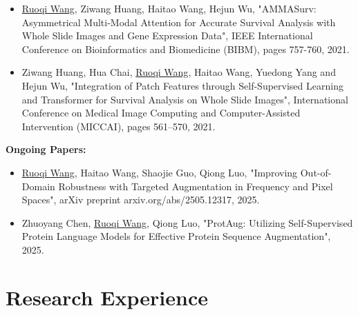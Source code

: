\documentclass[letterpaper,10pt]{article}
\begin{document}
\begin{CJK}{UTF8}{gbsn}
\begin{itemize}
    \item{
    \underline{Ruoqi Wang}, Ziwang Huang, Haitao Wang, Hejun Wu, "{AMMASurv: Asymmetrical Multi-Modal Attention for Accurate Survival Analysis with Whole Slide Images and Gene Expression Data}", IEEE International Conference on Bioinformatics and Biomedicine (BIBM), pages 757-760, 2021.
    }

    \item{
    Ziwang Huang, Hua Chai, \underline{Ruoqi Wang}, Haitao Wang, Yuedong Yang and Hejun Wu, "{Integration of Patch Features through Self-Supervised Learning and Transformer for Survival Analysis on Whole Slide Images}", International Conference on Medical Image Computing and Computer-Assisted Intervention (MICCAI), pages 561–570, 2021.
    }

 \end{itemize}


\vspace{2pt}
\textbf{Ongoing Papers:}
\begin{itemize}
    \item{
    \underline{Ruoqi Wang}, Haitao Wang, Shaojie Guo, Qiong Luo, "{Improving Out-of-Domain Robustness with Targeted Augmentation in Frequency and Pixel Spaces}", arXiv preprint arxiv.org/abs/2505.12317, 2025.
    }

    \item{
    Zhuoyang Chen, \underline{Ruoqi Wang}, Qiong Luo, "{ProtAug: Utilizing Self-Supervised Protein Language Models for Effective Protein Sequence Augmentation}", 2025.
    }
\end{itemize}


\section{\Large{Research Experience}}



\end{CJK}
\end{document}

